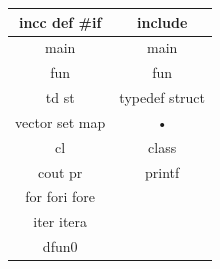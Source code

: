 \documentclass[a4paper,12pt,twoside]{book}
\begin{document}
\begin{itemize}
\begin{tabular}{|c|c|}
\hline 
incc def \#if & include \\ 
\hline 
main & main \\ 
\hline 
fun & fun \\ 
\hline 
td st & typedef struct \\ 
\hline 
vector set map & • \\ 
\hline 
cl & class \\ 
\hline 
cout pr & printf \\ 
\hline 
for fori fore &  \\ 
\hline 
iter itera &  \\ 
\hline 
dfun0  &  \\ 

\hline 
\end{tabular} 
\end{itemize}
\end{document}
